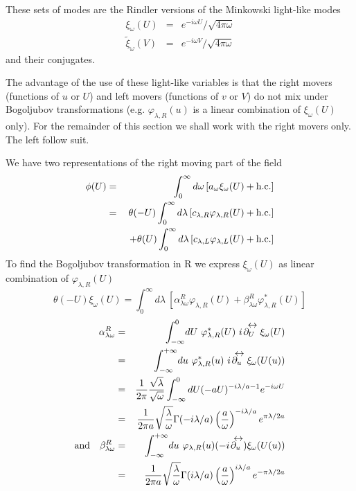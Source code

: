 \documentclass[12pt,oneside]{report}
\def\om{\omega	}
\def\la{\lambda}
\def\lr #1{\mathrel{#1\kern-.75em\raise1.75ex\hbox{$\leftrightarrow$}}}
\begin{document}
These sets of modes are the Rindler versions of the Minkowski light-like modes
\begin{eqnarray}
\xi_\om (U) &=& {e^{-i \om U} / \sqrt{4 \pi \om}}\nonumber\\
\tilde \xi_\om (V) &=& {e^{-i \om V} / \sqrt{4 \pi \om}}
\label{twonul}
\end{eqnarray}
and their conjugates.

The advantage of the use of these light-like variables is that the right
movers (functions of $u$ or $U$) and left movers (functions of $v$ or $V$)
do not mix under Bogoljubov transformations (e.g. $\varphi_{\la,R}(u)$ is a
linear combination of $\xi_\om (U)$ only). For the remainder of this section
we shall work with the right movers only. The left follow suit.

We have two representations of the right moving part of the field
\begin{eqnarray}
\phi(U) &=& \int_0 ^\infty d \om \left[ a_\om \xi_\om(U) +
\hbox{h.c.} \right]
\nonumber\\
&=& \theta( -U)
\int_0 ^\infty d \la \left[ c_{\la,R} \varphi_{\la , R}(U) + \hbox{h.c.}
\right]\nonumber\\
&\ & \ + \theta(U)
\int_0 ^\infty d \la \left[ c_{\la,L} \varphi_{\la , L}(U) + \hbox{h.c.}
\right]
\label{twoone}
\end{eqnarray}
To find the Bogoljubov transformation in R we express $\xi_\om (U)$ as
linear combination of $\varphi_{\la,R}(U)$ 
\begin{equation}
\theta(-U)\xi_\om (U)
=
\int_0^\infty \! d \la \ \left[
\alpha_{\la \om}^R \varphi_{\la , R}(U) + \beta_{\la \om}^R \varphi^*_{\la ,
R}(U) \right]
\label{twotwoa}\end{equation}
\begin{eqnarray}
\alpha_{\la \om}^R &=& 
\int_{- \infty}^{0}
\! dU\ \varphi_{\la,R}^*(U)\  i \! \lr {\partial_U} 
\xi_\om (U) \nonumber\\ 
&=& 
\int_{- \infty}^{+\infty}
\! du\ \varphi_{\la,R}^*(u)\  i \! \lr {\partial_u} 
\xi_\om (U(u)) \nonumber\\ 
&=& {1 \over 2 \pi} { \sqrt{ \lambda} \over \sqrt{\omega}}
\int_{-\infty}^0 dU 
(-a U )^{- i \lambda / a -1}
e^{- i \omega U} \nonumber\\
&=& 
{1 \over 2 \pi a} \sqrt{\la \over \om} 
\Gamma(-i \la/a)  
\left( {a \over \om} \right)^{-i \la/a}
e^{\pi \la / 2a}\nonumber\\
\mbox{and}\quad
\beta_{\la \om}^R  &=& \int_{- \infty}^{+ \infty}
\! du\  \varphi_{\la,R}(u) (-i\! \lr{ \partial_u}) 
\xi_\om (U(u)) \nonumber\\ &=& 
{1 \over 2 \pi a} \sqrt{\la \over \om}
\Gamma(i \la/a) 
\left( {a \over \om} \right)^{i \la/a}
e^{-\pi \la / 2a} 
\label{twotwo}
\end{eqnarray}
\end{document}
